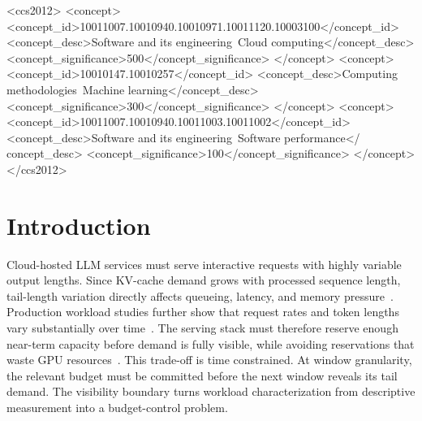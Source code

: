 \documentclass[sigplan,10pt, anonymous]{acmart}
\begin{document}
\begin{CCSXML}
 <ccs2012>
 <concept>
 <concept_id>10011007.10010940.10010971.10011120.10003100</concept_id>
 <concept_desc>Software and its engineering~Cloud computing</concept_desc>
 <concept_significance>500</concept_significance>
 </concept>
 <concept>
 <concept_id>10010147.10010257</concept_id>
 <concept_desc>Computing methodologies~Machine learning</concept_desc>
 <concept_significance>300</concept_significance>
 </concept>
 <concept>
 <concept_id>10011007.10010940.10011003.10011002</concept_id>
 <concept_desc>Software and its engineering~Software performance</
 concept_desc>
 <concept_significance>100</concept_significance>
 </concept>
 </ccs2012>
\end{CCSXML}





\maketitle


\section{Introduction}
\label{sec:introduction}

Cloud-hosted LLM services must serve interactive requests with highly variable output lengths. Since KV-cache demand grows with processed sequence length, tail-length variation directly affects queueing, latency, and memory pressure~\cite{Sun2024OSDI,Sheng2024OSDI,Woosuk2023SOSP,Qin2025}. Production workload studies further show that request rates and token lengths vary substantially over time~\cite{Wang2025KDD,Xiang2026NSDI}. The serving stack must therefore reserve enough near-term capacity before demand is fully visible, while avoiding reservations that waste GPU resources~\cite{Zhong2024OSDI}. This trade-off is time constrained. At window granularity, the relevant budget must be committed before the next window reveals its tail demand. The visibility boundary turns workload characterization from descriptive measurement into a budget-control problem.
\end{document}
